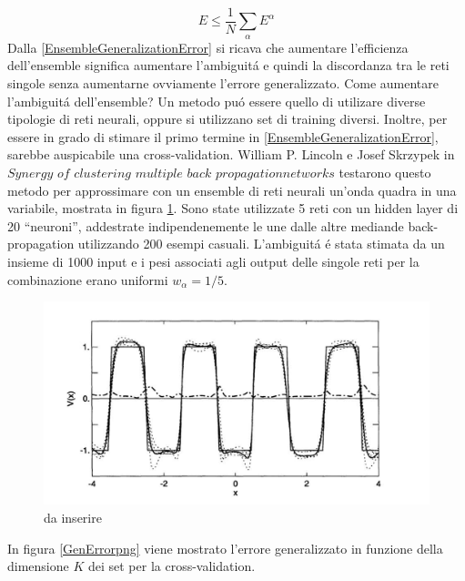 \documentclass[a4paper,10pt]{article}
\begin{document}
  \begin{equation}
   E \le \frac{1}{N} \sum_{\alpha} E^{\alpha}
  \end{equation}
  Dalla \ref{EnsembleGeneralizationError} si ricava che aumentare l'efficienza dell'ensemble significa aumentare l'ambiguit\'a e quindi la discordanza tra le reti singole senza aumentarne ovviamente l'errore generalizzato. Come aumentare l'ambiguit\'a dell'ensemble? Un metodo pu\'o essere quello di utilizare diverse tipologie di reti neurali, oppure si utilizzano set di training diversi. Inoltre, per essere in grado di stimare il primo termine in \ref{EnsembleGeneralizationError}, sarebbe auspicabile una cross-validation. William P. Lincoln e Josef Skrzypek in $Synergy$ $of$ $clustering$ $multiple$ $back$ $propagation networks$ testarono questo metodo per approssimare con un ensemble di reti neurali un'onda quadra in una variabile, mostrata in figura \ref{SqWavepng}. Sono state utilizzate 5 reti con un hidden layer di 20 ``neuroni'', addestrate indipendenemente le une dalle altre mediande back-propagation utilizzando 200 esempi casuali. L'ambiguit\'a \'e stata stimata da un insieme di 1000 input e i pesi associati agli output delle singole reti per la combinazione erano uniformi $w_{\alpha} = 1/5$.
  \begin{figure}[h!]
   \centering
   \includegraphics[scale=0.4]{SqWave.png}
   \caption{da inserire}
   \label{SqWavepng}
  \end{figure}
  In figura \ref{GenErrorpng} viene mostrato l'errore generalizzato in funzione della dimensione $K$ dei set per la cross-validation.
\end{document}
